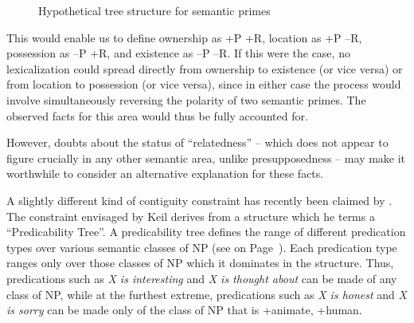
\begin{figure}
	\begin{center}
		
		
		\caption{Hypothetical tree structure for semantic primes}\label{fig:4.6}
	\end{center}
\end{figure}

This would enable us to define ownership as +P +R, location as +P --R, possession as --P +R, and existence as --P --R. If this were the case, no lexicalization could spread directly from ownership to existence (or vice versa) or from location to possession (or vice versa), since in either case the process would involve simultaneously reversing the polarity of two semantic primes. The observed facts for this area would thus be fully accounted for. 

However, doubts about the status of ``relatedness'' -- which does not appear to figure crucially in any other semantic area, unlike presupposedness -- may make it worthwhile to consider an alternative explanation for these facts.

A slightly different kind of contiguity constraint has recently been claimed by \citet{Keil1979,Keil1981}. The constraint envisaged by Keil derives from a structure which he terms a ``Predicability Tree''. A predicability tree defines the range of different predication types over various semantic classes of NP (see  on Page~\pageref{fig:4.7}). Each predication type ranges only over those classes of NP which it dominates in the structure. Thus, predications such as \textit{X is interesting} and \textit{X is thought about} can be made of any class of NP, while at the
furthest extreme, predications such as \textit{X is honest} and \textit{X is sorry} can be made only of the class of NP that is +animate, +human.

